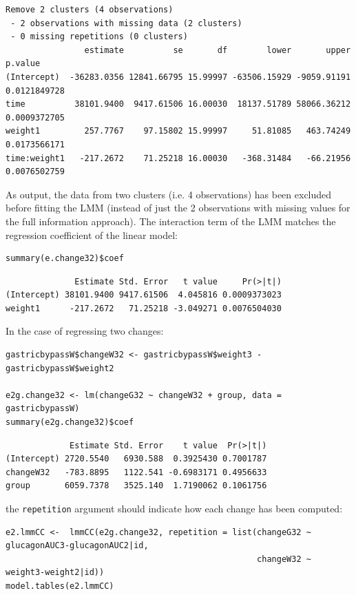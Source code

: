\documentclass[12pt]{article}
\begin{document}
\begin{verbatim}
Remove 2 clusters (4 observations) 
 - 2 observations with missing data (2 clusters) 
 - 0 missing repetitions (0 clusters)
                estimate          se       df        lower       upper      p.value
(Intercept)  -36283.0356 12841.66795 15.99997 -63506.15929 -9059.91191 0.0121849728
time          38101.9400  9417.61506 16.00030  18137.51789 58066.36212 0.0009372705
weight1         257.7767    97.15802 15.99997     51.81085   463.74249 0.0173566171
time:weight1   -217.2672    71.25218 16.00030   -368.31484   -66.21956 0.0076502759
\end{verbatim}


As output, the data from two clusters (i.e. 4 observations) has been
excluded before fitting the LMM (instead of just the 2 observations
with missing values for the full information approach). The
interaction term of the LMM matches the regression coefficient of the
linear model:
\lstset{language=r,label= ,caption= ,captionpos=b,numbers=none}
\begin{lstlisting}
summary(e.change32)$coef
\end{lstlisting}

\begin{verbatim}
              Estimate Std. Error   t value     Pr(>|t|)
(Intercept) 38101.9400 9417.61506  4.045816 0.0009373023
weight1      -217.2672   71.25218 -3.049271 0.0076504030
\end{verbatim}


In the case of regressing two changes:
\lstset{language=r,label= ,caption= ,captionpos=b,numbers=none}
\begin{lstlisting}
gastricbypassW$changeW32 <- gastricbypassW$weight3 - gastricbypassW$weight2

e2g.change32 <- lm(changeG32 ~ changeW32 + group, data = gastricbypassW)
summary(e2g.change32)$coef
\end{lstlisting}

\begin{verbatim}
             Estimate Std. Error    t value  Pr(>|t|)
(Intercept) 2720.5540   6930.588  0.3925430 0.7001787
changeW32   -783.8895   1122.541 -0.6983171 0.4956633
group       6059.7378   3525.140  1.7190062 0.1061756
\end{verbatim}


the \texttt{repetition} argument should indicate how each change has
been computed:
\lstset{language=r,label= ,caption= ,captionpos=b,numbers=none}
\begin{lstlisting}
e2.lmmCC <-  lmmCC(e2g.change32, repetition = list(changeG32 ~ glucagonAUC3-glucagonAUC2|id,
                                                   changeW32 ~ weight3-weight2|id))
model.tables(e2.lmmCC)
\end{lstlisting}
\end{document}
